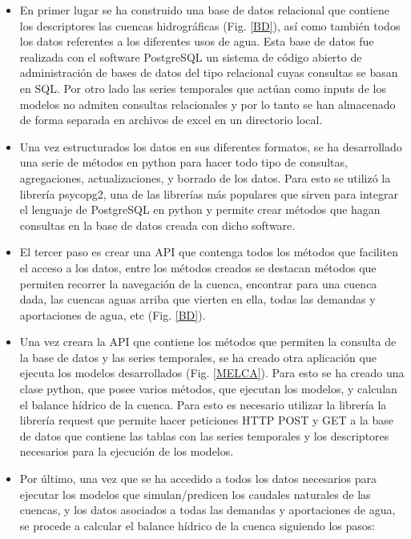 \begin{itemize}
    \item En primer lugar se ha construido una base de datos relacional que contiene los descriptores las cuencas hidrográficas (Fig. \ref{BD}), así como 
   también todos los datos referentes a los diferentes usos de agua. Esta base de datos fue realizada con el software PostgreSQL  un sistema 
   de código abierto de administración de bases de datos del tipo relacional cuyas consultas  se basan en SQL\cite{PostgretSQL}.
   Por otro lado las series temporales que actúan como inputs de los modelos no admiten consultas relacionales y por lo tanto 
   se han almacenado de forma separada en archivos de excel en un directorio local. 
   \item Una vez estructurados los datos en sus diferentes formatos, se ha desarrollado una serie de métodos en python para hacer todo tipo de consultas,
   agregaciones, actualizaciones, y borrado de los datos. Para esto se utilizó la librería psycopg2, una de las librerías más populares que sirven para 
   integrar el lenguaje de PostgreSQL en python y permite crear métodos que hagan consultas en la base de datos creada con dicho software.
   \item El tercer paso es crear una API que contenga todos los métodos que faciliten el acceso a los datos, entre los métodos creados se destacan 
   métodos que 
   permiten recorrer la navegación de la cuenca, encontrar para una cuenca dada,  las cuencas aguas arriba que vierten en ella,
    todas las demandas y aportaciones de agua, etc (Fig. \ref{BD}).
    \item Una vez creara la API que contiene los métodos que permiten la consulta de la base de datos y las series temporales, 
    se ha creado otra aplicación que ejecuta los modelos desarrollados (Fig. \ref{MELCA}). Para esto se ha creado una clase python, que posee varios métodos, 
    que ejecutan los modelos, y calculan el balance hídrico de la cuenca. Para esto es necesario utilizar la librería
    la librería request que permite hacer peticiones HTTP POST y GET a la base de datos que contiene las tablas con las series temporales y 
    los descriptores necesarios para la ejecución de los modelos.
    \item Por último, una vez que se ha accedido a todos los datos necesarios para ejecutar los modelos que simulan/predicen los caudales
    naturales de las cuencas, y los datos asociados a todas las demandas y aportaciones de agua, 
    se procede a  calcular el balance hídrico de la cuenca siguiendo los pasos:

\end{itemize}
